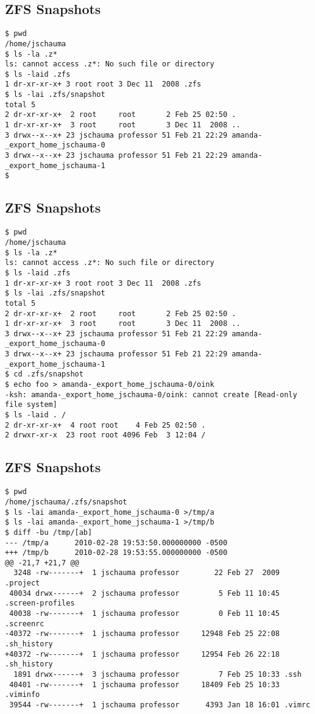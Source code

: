 \documentclass[xga]{xdvislides}
\begin{document}
\subsection{ZFS Snapshots}
\smallish
\begin{verbatim}
$ pwd
/home/jschauma
$ ls -la .z*
ls: cannot access .z*: No such file or directory
$ ls -laid .zfs
1 dr-xr-xr-x+ 3 root root 3 Dec 11  2008 .zfs
$ ls -lai .zfs/snapshot
total 5
2 dr-xr-xr-x+  2 root     root       2 Feb 25 02:50 .
1 dr-xr-xr-x+  3 root     root       3 Dec 11  2008 ..
3 drwx--x--x+ 23 jschauma professor 51 Feb 21 22:29 amanda-_export_home_jschauma-0
3 drwx--x--x+ 23 jschauma professor 51 Feb 21 22:29 amanda-_export_home_jschauma-1
$
\end{verbatim}
\Normalsize

\subsection{ZFS Snapshots}
\smallish
\begin{verbatim}
$ pwd
/home/jschauma
$ ls -la .z*
ls: cannot access .z*: No such file or directory
$ ls -laid .zfs
1 dr-xr-xr-x+ 3 root root 3 Dec 11  2008 .zfs
$ ls -lai .zfs/snapshot
total 5
2 dr-xr-xr-x+  2 root     root       2 Feb 25 02:50 .
1 dr-xr-xr-x+  3 root     root       3 Dec 11  2008 ..
3 drwx--x--x+ 23 jschauma professor 51 Feb 21 22:29 amanda-_export_home_jschauma-0
3 drwx--x--x+ 23 jschauma professor 51 Feb 21 22:29 amanda-_export_home_jschauma-1
$ cd .zfs/snapshot
$ echo foo > amanda-_export_home_jschauma-0/oink
-ksh: amanda-_export_home_jschauma-0/oink: cannot create [Read-only file system]
$ ls -laid . /
2 dr-xr-xr-x+  4 root root    4 Feb 25 02:50 .
2 drwxr-xr-x  23 root root 4096 Feb  3 12:04 /
\end{verbatim}
\Normalsize

\subsection{ZFS Snapshots}
\smallish
\begin{verbatim}
$ pwd
/home/jschauma/.zfs/snapshot
$ ls -lai amanda-_export_home_jschauma-0 >/tmp/a
$ ls -lai amanda-_export_home_jschauma-1 >/tmp/b
$ diff -bu /tmp/[ab]
--- /tmp/a      2010-02-28 19:53:50.000000000 -0500
+++ /tmp/b      2010-02-28 19:53:55.000000000 -0500
@@ -21,7 +21,7 @@
  3248 -rw-------+  1 jschauma professor        22 Feb 27  2009 .project
 40034 drwx------+  2 jschauma professor         5 Feb 11 10:45 .screen-profiles
 40038 -rw-------+  1 jschauma professor         0 Feb 11 10:45 .screenrc
-40372 -rw-------+  1 jschauma professor     12948 Feb 25 22:08 .sh_history
+40372 -rw-------+  1 jschauma professor     12954 Feb 26 22:18 .sh_history
  1891 drwx------+  3 jschauma professor         7 Feb 25 10:33 .ssh
 40401 -rw-------+  1 jschauma professor     18409 Feb 25 10:33 .viminfo
 39544 -rw-------+  1 jschauma professor      4393 Jan 18 16:01 .vimrc
\end{verbatim}
\Normalsize
\end{document}
